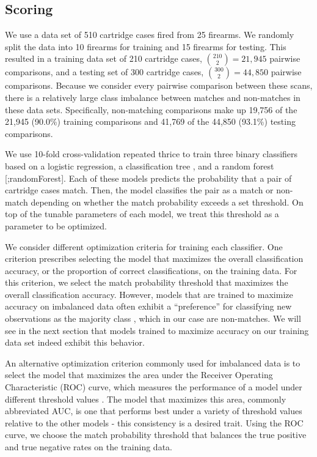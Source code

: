 \documentclass[11pt,]{isuthesis}
\begin{document}
\hypertarget{scoring}{%
\subsection{Scoring}\label{scoring}}

We use a data set of 510 cartridge cases fired from 25 firearms.
We randomly split the data into 10 firearms for training and 15 firearms for testing.
This resulted in a training data set of 210 cartridge cases, \(\binom{210}{2} = 21,945\) pairwise comparisons, and a testing set of 300 cartridge cases, \(\binom{300}{2} = 44,850\) pairwise comparisons.
Because we consider every pairwise comparison between these scans, there is a relatively large class imbalance between matches and non-matches in these data sets.
Specifically, non-matching comparisons make up 19,756 of the 21,945 (90.0\%) training comparisons and 41,769 of the 44,850 (93.1\%) testing comparisons.

We use 10-fold cross-validation repeated thrice \citep{caret} to train three binary classifiers based on a logistic regression, a classification tree \citep{rpart}, and a random forest {[}\citet{breiman};randomForest{]}.
Each of these models predicts the probability that a pair of cartridge cases match.
Then, the model classifies the pair as a match or non-match depending on whether the match probability exceeds a set threshold.
On top of the tunable parameters of each model, we treat this threshold as a parameter to be optimized.

We consider different optimization criteria for training each classifier.
One criterion prescribes selecting the model that maximizes the overall classification accuracy, or the proportion of correct classifications, on the training data.
For this criterion, we select the match probability threshold that maximizes the overall classification accuracy.
However, models that are trained to maximize accuracy on imbalanced data often exhibit a ``preference'' for classifying new observations as the majority class \citep{Fernndez2018}, which in our case are non-matches.
We will see in the next section that models trained to maximize accuracy on our training data set indeed exhibit this behavior.

An alternative optimization criterion commonly used for imbalanced data is to select the model that maximizes the area under the Receiver Operating Characteristic (ROC) curve, which measures the performance of a model under different threshold values \citep{James2013}.
The model that maximizes this area, commonly abbreviated AUC, is one that performs best under a variety of threshold values relative to the other models - this consistency is a desired trait.
Using the ROC curve, we choose the match probability threshold that balances the true positive and true negative rates on the training data.
\end{document}
